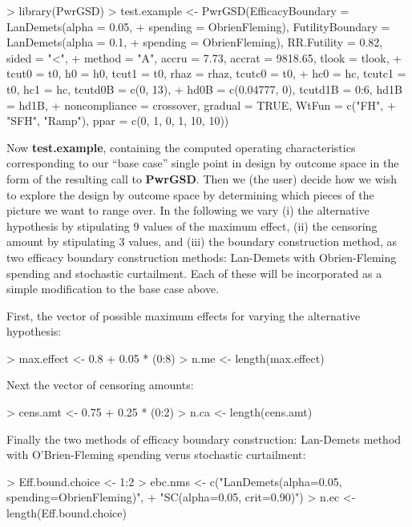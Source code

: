 \documentclass{article}
\begin{document}
\begin{Schunk}
\begin{Sinput}
> library(PwrGSD)
> test.example <- PwrGSD(EfficacyBoundary = LanDemets(alpha = 0.05, 
+     spending = ObrienFleming), FutilityBoundary = LanDemets(alpha = 0.1, 
+     spending = ObrienFleming), RR.Futility = 0.82, sided = "<", 
+     method = "A", accru = 7.73, accrat = 9818.65, tlook = tlook, 
+     tcut0 = t0, h0 = h0, tcut1 = t0, rhaz = rhaz, tcutc0 = t0, 
+     hc0 = hc, tcutc1 = t0, hc1 = hc, tcutd0B = c(0, 13), 
+     hd0B = c(0.04777, 0), tcutd1B = 0:6, hd1B = hd1B, 
+     noncompliance = crossover, gradual = TRUE, WtFun = c("FH", 
+         "SFH", "Ramp"), ppar = c(0, 1, 0, 1, 10, 10))
\end{Sinput}
\end{Schunk}

Now {\bf test.example}, containing the computed operating characteristics
corresponding to our ``base case'' single point in design by outcome space in
the form of the resulting call to {\bf PwrGSD}.  Then we (the user) decide
how we wish to explore the design by outcome space by determining which pieces
of the picture we want to range over.  In the following we vary (i) the
alternative hypothesis by stipulating 9 values of the maximum effect, (ii) the
censoring amount by stipulating 3 values, and (iii) the boundary construction
method, as two efficacy boundary construction methods: Lan-Demets with
Obrien-Fleming spending and stochastic curtailment. Each of these will be
incorporated as a simple modification to the base case above.  

First, the vector of possible maximum effects for varying the alternative hypothesis:
\begin{Schunk}
\begin{Sinput}
> max.effect <- 0.8 + 0.05 * (0:8)
> n.me <- length(max.effect)
\end{Sinput}
\end{Schunk}

Next the vector of censoring amounts:
\begin{Schunk}
\begin{Sinput}
> cens.amt <- 0.75 + 0.25 * (0:2)
> n.ca <- length(cens.amt)
\end{Sinput}
\end{Schunk}

Finally the two methods of efficacy boundary construction: Lan-Demets method
with O'Brien-Fleming spending verus stochastic curtailment:  
\begin{Schunk}
\begin{Sinput}
> Eff.bound.choice <- 1:2
> ebc.nms <- c("LanDemets(alpha=0.05, spending=ObrienFleming)", 
+     "SC(alpha=0.05, crit=0.90)")
> n.ec <- length(Eff.bound.choice)
\end{Sinput}
\end{Schunk}
\end{document}
